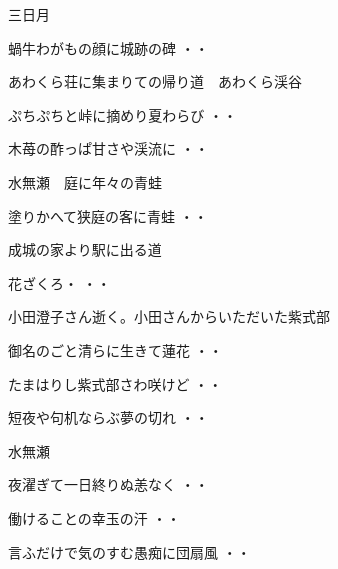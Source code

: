 \vspace{ 0.4cm}
三日月
\begin{shiika}蝸牛わがもの顔に城跡の碑
\hfill{・・}\end{shiika}
\vspace{ 0.4cm}
あわくら荘に集まりての帰り道　あわくら渓谷
\begin{shiika}ぷちぷちと峠に摘めり夏わらび
\hfill{・・}\end{shiika}
\begin{shiika}木苺の酢っぱ甘さや渓流に
\hfill{・・}\end{shiika}
\vspace{ 0.4cm}
水無瀬　庭に年々の青蛙
\begin{shiika}塗りかへて狭庭の客に青蛙
\hfill{・・}\end{shiika}
\vspace{ 0.4cm}
成城の家より駅に出る道
\begin{shiika}花ざくろ・
\hfill{・・}\end{shiika}
\vspace{ 0.4cm}
小田澄子さん逝く。小田さんからいただいた紫式部
\begin{shiika}御名のごと清らに生きて蓮花
\hfill{・・}\end{shiika}
\begin{shiika}たまはりし紫式部さわ咲けど
\hfill{・・}\end{shiika}
\begin{shiika}短夜や句机ならぶ夢の切れ
\hfill{・・}\end{shiika}
\vspace{ 0.4cm}
水無瀬
\begin{shiika}夜濯ぎて一日終りぬ恙なく
\hfill{・・}\end{shiika}
\vspace{ 0.4cm}
\begin{shiika}働けることの幸玉の汗
\hfill{・・}\end{shiika}
\vspace{ 0.4cm}
\begin{shiika}言ふだけで気のすむ愚痴に団扇風
\hfill{・・}\end{shiika}
\vspace{ 0.4cm}
